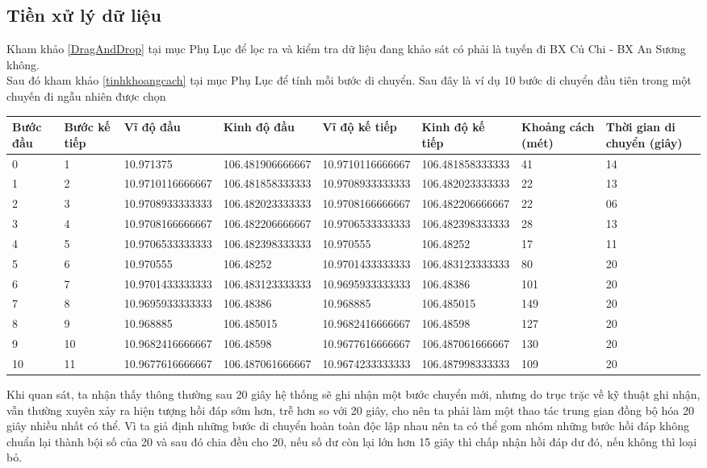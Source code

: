 \documentclass[a4paper, 13pt]{report}
\begin{document}
\subsection{Tiền xử lý dữ liệu} 
Kham khảo \ref{DragAndDrop} tại mục Phụ Lục để lọc ra và kiểm tra dữ liệu đang khảo sát có phải là tuyến đi BX Củ Chi - BX An Sương không.\\ Sau đó kham khảo \ref{tinhkhoangcach} tại mục Phụ Lục để tính mỗi bước di chuyển. Sau đây là ví dụ 10 bước di chuyển đầu tiên trong một chuyến đi ngẫu nhiên được chọn\\
\begin{flushleft}
\begin{tabular}{|p{1cm}|p{1cm}|p{2.6cm}|p{2.6cm}|p{2.6cm}|p{2.6cm}|p{1cm}|p{1cm}| }
\hline
Bước đầu & Bước kế tiếp & Vĩ độ đầu & Kinh độ đầu & Vĩ độ kế tiếp & Kinh độ kế tiếp & Khoảng cách (mét) & Thời gian di chuyển (giây) \\ 
\hline
0 & 1 & 10.971375 & 106.481906666667 & 10.9710116666667 & 106.481858333333 & 41 & 14 \\
\hline
1 & 2 & 10.9710116666667 & 106.481858333333 & 10.9708933333333 & 106.482023333333 & 22 & 13 \\
\hline
2 & 3 & 10.9708933333333 & 106.482023333333 & 10.9708166666667 & 106.482206666667 & 22 & 06 \\
\hline
3 & 4 & 10.9708166666667 & 106.482206666667 & 10.9706533333333 & 106.482398333333 & 28 & 13 \\
\hline
4 & 5 & 10.9706533333333 & 106.482398333333 & 10.970555 & 106.48252 & 17 & 11 \\
\hline
5 & 6 & 10.970555 & 106.48252 & 10.9701433333333 & 106.483123333333 & 80 & 20 \\
\hline
6 & 7 & 10.9701433333333 & 106.483123333333 & 10.9695933333333 & 106.48386 & 101 & 20 \\
\hline
7 & 8 & 10.9695933333333 & 106.48386 & 10.968885 & 106.485015 & 149 & 20 \\
\hline
8 & 9 & 10.968885 & 106.485015 & 10.9682416666667 & 106.48598 & 127 & 20 \\
\hline
9 & 10 & 10.9682416666667 & 106.48598 & 10.9677616666667 & 106.487061666667 & 130 & 20 \\
\hline
10 & 11 & 10.9677616666667 & 106.487061666667 & 10.9674233333333 & 106.487998333333 & 109 & 20 \\
\hline 
\end{tabular}
\end{flushleft}
Khi quan sát, ta nhận thấy thông thường sau 20 giây hệ thống sẽ ghi nhận một bước chuyển mới, nhưng do trục trặc về kỹ thuật ghi nhận, vẫn thường xuyên xảy ra hiện tượng hồi đáp sớm hơn, trễ hơn so với 20 giây, cho nên ta phải làm một thao tác trung gian đồng bộ hóa 20 giây nhiều nhất có thể. Vì ta giả định những bước di chuyển hoàn toàn độc lập nhau nên ta có thể gom nhóm những bước hồi đáp không chuẩn lại thành bội số của 20 và sau đó chia đều cho 20, nếu số dư còn lại lớn hơn 15 giây thì chấp nhận hồi đáp dư đó, nếu không thì loại bỏ.\\      
\end{document}
